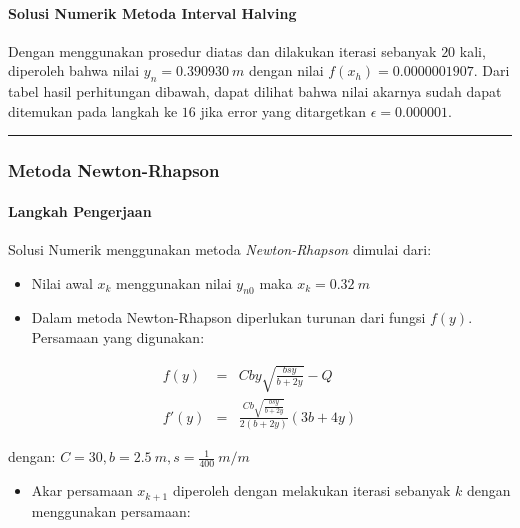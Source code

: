 \documentclass[10pt, a4paper]{article}
\providecommand{\tightlist}{%
      \setlength{\itemsep}{0pt}\setlength{\parskip}{0pt}}
\begin{document}
    \paragraph{Solusi Numerik Metoda Interval
Halving}\label{solusi-numerik-metoda-interval-halving}

Dengan menggunakan prosedur diatas dan dilakukan iterasi sebanyak \(20\)
kali, diperoleh bahwa nilai \(y_n = 0.390930\ m\) dengan nilai
\(f(x_h) = 0.0000001907\). Dari tabel hasil perhitungan dibawah, dapat
dilihat bahwa nilai akarnya sudah dapat ditemukan pada langkah ke \(16\)
jika error yang ditargetkan \(\epsilon = 0.000001\).

    \begin{center}\rule{0.5\linewidth}{\linethickness}\end{center}

\newpage
\subsubsection{Metoda Newton-Rhapson}\label{metoda-newton-rhapson}

\paragraph{Langkah Pengerjaan}\label{langkah-pengerjaan}

Solusi Numerik menggunakan metoda \emph{Newton-Rhapson} dimulai dari:

\begin{itemize}
\item
  Nilai awal \(x_k\) menggunakan nilai \(y_{n0}\) maka \(x_k = 0.32\ m\)
\item
  Dalam metoda Newton-Rhapson diperlukan turunan dari fungsi \(f(y)\).
  Persamaan yang digunakan:
\end{itemize}

\[\begin{aligned} f(y) &=& C b y \sqrt{\frac{b s y}{b + 2 y}} - Q \\
f'(y) &=& \frac{C b \sqrt{\frac{b s y}{b + 2 y}}}{2 \left(b + 2 y\right)} \left(3 b + 4 y\right) 
\end{aligned}\]

dengan: \(C = 30, b = 2.5\ m, s = \frac{1}{400}\ m/m\)

\begin{itemize}
\tightlist
\item
  Akar persamaan \(x_{k+1}\) diperoleh dengan melakukan iterasi sebanyak
  \(k\) dengan menggunakan persamaan:
\end{itemize}
\end{document}
